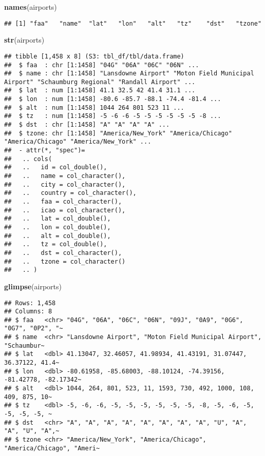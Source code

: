 \documentclass[
]{article}
\newenvironment{Shaded}{\begin{snugshade}}{\end{snugshade}}
\newcommand{\FunctionTok}[1]{\textcolor[rgb]{0.13,0.29,0.53}{\textbf{#1}}}
\newcommand{\NormalTok}[1]{#1}
\begin{document}
\begin{Shaded}
\begin{Highlighting}[]
\FunctionTok{names}\NormalTok{(airports)}
\end{Highlighting}
\end{Shaded}

\begin{verbatim}
## [1] "faa"   "name"  "lat"   "lon"   "alt"   "tz"    "dst"   "tzone"
\end{verbatim}

\begin{Shaded}
\begin{Highlighting}[]
\FunctionTok{str}\NormalTok{(airports)}
\end{Highlighting}
\end{Shaded}

\begin{verbatim}
## tibble [1,458 x 8] (S3: tbl_df/tbl/data.frame)
##  $ faa  : chr [1:1458] "04G" "06A" "06C" "06N" ...
##  $ name : chr [1:1458] "Lansdowne Airport" "Moton Field Municipal Airport" "Schaumburg Regional" "Randall Airport" ...
##  $ lat  : num [1:1458] 41.1 32.5 42 41.4 31.1 ...
##  $ lon  : num [1:1458] -80.6 -85.7 -88.1 -74.4 -81.4 ...
##  $ alt  : num [1:1458] 1044 264 801 523 11 ...
##  $ tz   : num [1:1458] -5 -6 -6 -5 -5 -5 -5 -5 -5 -8 ...
##  $ dst  : chr [1:1458] "A" "A" "A" "A" ...
##  $ tzone: chr [1:1458] "America/New_York" "America/Chicago" "America/Chicago" "America/New_York" ...
##  - attr(*, "spec")=
##   .. cols(
##   ..   id = col_double(),
##   ..   name = col_character(),
##   ..   city = col_character(),
##   ..   country = col_character(),
##   ..   faa = col_character(),
##   ..   icao = col_character(),
##   ..   lat = col_double(),
##   ..   lon = col_double(),
##   ..   alt = col_double(),
##   ..   tz = col_double(),
##   ..   dst = col_character(),
##   ..   tzone = col_character()
##   .. )
\end{verbatim}

\begin{Shaded}
\begin{Highlighting}[]
\FunctionTok{glimpse}\NormalTok{(airports)}
\end{Highlighting}
\end{Shaded}

\begin{verbatim}
## Rows: 1,458
## Columns: 8
## $ faa   <chr> "04G", "06A", "06C", "06N", "09J", "0A9", "0G6", "0G7", "0P2", "~
## $ name  <chr> "Lansdowne Airport", "Moton Field Municipal Airport", "Schaumbur~
## $ lat   <dbl> 41.13047, 32.46057, 41.98934, 41.43191, 31.07447, 36.37122, 41.4~
## $ lon   <dbl> -80.61958, -85.68003, -88.10124, -74.39156, -81.42778, -82.17342~
## $ alt   <dbl> 1044, 264, 801, 523, 11, 1593, 730, 492, 1000, 108, 409, 875, 10~
## $ tz    <dbl> -5, -6, -6, -5, -5, -5, -5, -5, -5, -8, -5, -6, -5, -5, -5, -5, ~
## $ dst   <chr> "A", "A", "A", "A", "A", "A", "A", "A", "U", "A", "A", "U", "A",~
## $ tzone <chr> "America/New_York", "America/Chicago", "America/Chicago", "Ameri~
\end{verbatim}
\end{document}
